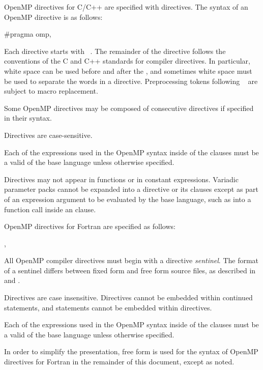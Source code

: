 \begin{ccppspecific}
OpenMP directives for C/C++ are specified with  directives.
The syntax of an OpenMP directive is as follows:

\begin{ompcPragma}
#pragma omp\plc{ directive-name [clause[ [},\plc{] clause] ... ] new-line}
\end{ompcPragma}

Each directive  starts with ~. The remainder of 
the directive follows the conventions of the C and C++ standards for compiler 
directives. In particular, white space can be used before and after the \pcode{\#}, 
and sometimes white space must be used to separate the words in a directive. 
Preprocessing tokens following ~
are subject to macro replacement.

Some OpenMP directives may be composed of consecutive 
directives if specified in their syntax.

Directives are case-sensitive.

Each of the expressions used in the OpenMP syntax inside of the clauses
must be a valid  of the base language unless
otherwise specified.
\end{ccppspecific}

\begin{cppspecific}
Directives may not appear in  functions or in constant expressions.
Variadic parameter packs cannot be expanded into a directive or its clauses
except as part of an expression argument to be evaluated by the base language,
such as into a function call inside an  clause.
\end{cppspecific}

\begin{fortranspecific}
OpenMP directives for Fortran are specified as follows:

\begin{ompfPragma}
\plc{sentinel directive-name [clause[ [},\plc{] clause]...]}
\end{ompfPragma}

All OpenMP compiler directives must begin with a directive \emph{sentinel}. 
The format of a sentinel differs between fixed form and free form source files, 
as described in  and 
.

Directives are case insensitive. Directives cannot be embedded within continued
statements, and statements cannot be embedded within directives.

Each of the expressions used in the OpenMP syntax inside of the clauses must 
be a valid  of the base language unless otherwise specified.

In order to simplify the presentation, free form is used for the syntax of OpenMP
directives for Fortran in the remainder of this document, except as noted.
\end{fortranspecific}

